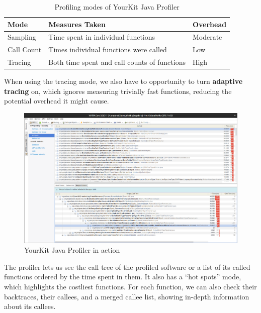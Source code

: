 \documentclass[11pt,a4paper,oneside]{report}
\begin{document}
\begin{table}[ht]
    \footnotesize
    \centering
    \begin{tabular}{ l l l }
        \toprule
        Mode & Measures Taken & Overhead \\
        \midrule
        Sampling & Time spent in individual functions & Moderate \\
        Call Count & Times individual functions were called & Low \\
        Tracing & Both time spent and call counts of functions & High \\
        \bottomrule
    \end{tabular}
    \caption{Profiling modes of YourKit Java Profiler}
    \label{tab:profiler-modes}
\end{table}

When using the tracing mode, we also have to opportunity to turn
\textbf{adaptive tracing} on, which ignores measuring trivially fast functions,
reducing the potential overhead it might cause.

\begin{figure}[ht]
\centering
\includegraphics[width=150mm, keepaspectratio]{figures/yourkit-profiler.png}
\caption{YourKit Java Profiler in action}
\label{fig:yourkit-profiler}
\end{figure}

\pagebreak

The profiler lets us see the call tree of the profiled software or a list of its
called functions ordered by the time spent in them. It also has a ``hot spots''
mode, which highlights the costliest functions. For each function, we can also
check their backtraces, their callees, and a merged callee list, showing
in-depth information about its callees.
\end{document}
